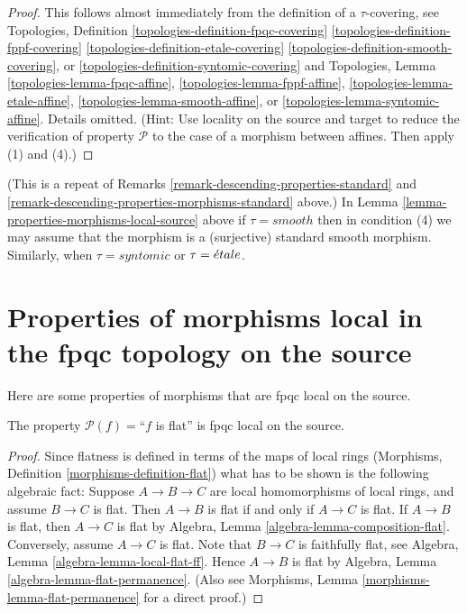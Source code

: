 \begin{proof}
This follows almost immediately from the definition of
a $\tau$-covering, see
Topologies, Definition
\ref{topologies-definition-fpqc-covering}
\ref{topologies-definition-fppf-covering}
\ref{topologies-definition-etale-covering}
\ref{topologies-definition-smooth-covering}, or
\ref{topologies-definition-syntomic-covering}
and Topologies, Lemma
\ref{topologies-lemma-fpqc-affine},
\ref{topologies-lemma-fppf-affine},
\ref{topologies-lemma-etale-affine},
\ref{topologies-lemma-smooth-affine}, or
\ref{topologies-lemma-syntomic-affine}.
Details omitted. (Hint: Use locality on the source and target to
reduce the verification of property $\mathcal{P}$ to the case of
a morphism between affines. Then apply (1) and (4).)
\end{proof}

\begin{remark}
\label{remark-properties-morphisms-local-source-standard}
(This is a repeat of
Remarks \ref{remark-descending-properties-standard}
and \ref{remark-descending-properties-morphisms-standard} above.)
In Lemma \ref{lemma-properties-morphisms-local-source} above if
$\tau = smooth$ then in condition (4) we may assume that
the morphism is a (surjective) standard smooth morphism.
Similarly, when $\tau = syntomic$ or $\tau = {\acute{e}tale}$.
\end{remark}



\section{Properties of morphisms local in the fpqc topology on the source}
\label{section-fpqc-local-source}

\noindent
Here are some properties of morphisms that are fpqc local on the source.

\begin{lemma}
\label{lemma-flat-fpqc-local-source}
The property $\mathcal{P}(f)=$``$f$ is flat'' is fpqc local on the source.
\end{lemma}

\begin{proof}
Since flatness is defined in terms of the maps of local rings
(Morphisms, Definition \ref{morphisms-definition-flat})
what has to be shown is the following
algebraic fact: Suppose $A \to B \to C$ are local homomorphisms of local
rings, and assume $B \to C$ is flat. Then $A \to B$ is
flat if and only if $A \to C$ is flat.
If $A \to B$ is flat, then $A \to C$ is flat by
Algebra, Lemma \ref{algebra-lemma-composition-flat}.
Conversely, assume $A \to C$ is flat.
Note that $B \to C$ is faithfully
flat, see
Algebra, Lemma \ref{algebra-lemma-local-flat-ff}.
Hence $A \to B$ is flat by
Algebra, Lemma \ref{algebra-lemma-flat-permanence}.
(Also see Morphisms, Lemma \ref{morphisms-lemma-flat-permanence}
for a direct proof.)
\end{proof}

